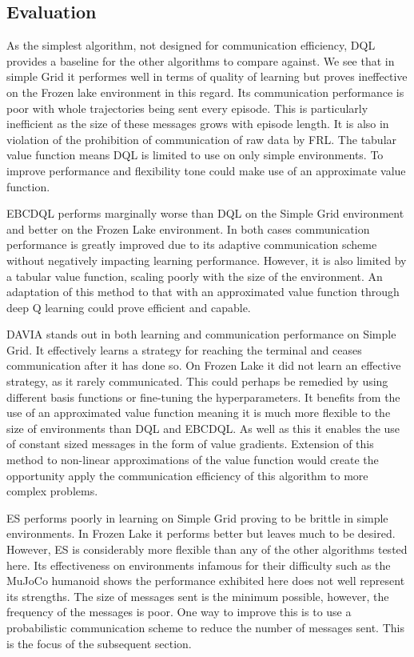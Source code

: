 \subsection{Evaluation}
As the simplest algorithm, not designed for communication efficiency, DQL provides a baseline for the other algorithms to compare against. We see that in simple Grid it performes well in terms of quality of learning but proves ineffective on the Frozen lake environment in this regard. Its communication performance is poor with whole trajectories being sent every episode. This is particularly inefficient as the size of these messages grows with episode length. It is also in violation of the prohibition of communication of raw data by FRL. The tabular value function means DQL is limited to use on only simple environments. To improve performance and flexibility tone could make use of an approximate value function.

EBCDQL performs marginally worse than DQL on the Simple Grid environment and better on the Frozen Lake environment. In both cases communication performance is greatly improved due to its adaptive communication scheme without negatively impacting learning performance. However, it is also limited by a tabular value function, scaling poorly with the size of the environment. An adaptation of this method to that with an approximated value function through deep Q learning could prove efficient and capable.

DAVIA stands out in both learning and communication performance on Simple Grid. It effectively learns a strategy for reaching the terminal and ceases communication after it has done so. On Frozen Lake it did not learn an effective strategy, as it rarely communicated. This could perhaps be remedied by using different basis functions or fine-tuning the hyperparameters. It benefits from the use of an approximated value function meaning it is much more flexible to the size of environments than DQL and EBCDQL. As well as this it enables the use of constant sized messages in the form of value gradients. Extension of this method to non-linear approximations of the value function would create the opportunity apply the communication efficiency of this algorithm to more complex problems.

ES performs poorly in learning on Simple Grid proving to be brittle in simple environments. In Frozen Lake it performs better but leaves much to be desired. However, ES is considerably more flexible than any of the other algorithms tested here. Its effectiveness on environments infamous for their difficulty such as the MuJoCo humanoid shows the performance exhibited here does not well represent its strengths. The size of messages sent is the minimum possible, however, the frequency of the messages is poor. One way to improve this is to use a probabilistic communication scheme to reduce the number of messages sent. This is the focus of the subsequent section.



